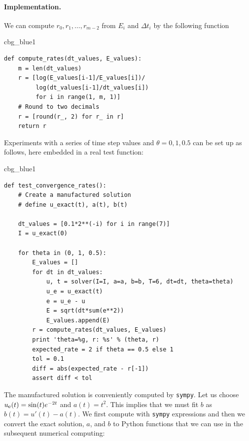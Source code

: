 \documentclass[%
oneside,                 %
final,                   %
10pt]{article}
\newenvironment{_cod_tight}[1]{
   \def\FrameCommand{\colorbox{#1}}
   \FrameRule0.6pt\MakeFramed {\FrameRestore}\vskip3mm}
   {\vskip0mm\endMakeFramed}
\newenvironment{cod}[1]{
\bgroup\rmfamily
\fboxsep=0mm\relax
\begin{_cod_tight}{#1}
\list{}{\parsep=-2mm\parskip=0mm\topsep=0pt\leftmargin=2mm
\rightmargin=2\leftmargin\leftmargin=4pt\relax}
\item\relax}
{\endlist\end{_cod_tight}\egroup}
\begin{document}
\paragraph{Implementation.}
We can compute $r_0, r_1, \ldots, r_{m-2}$ from $E_i$ and $\Delta t_i$
by the following function

\begin{cod}{cbg_blue1}\begin{Verbatim}[numbers=none,fontsize=\fontsize{9pt}{9pt},baselinestretch=0.95,xleftmargin=2mm]
def compute_rates(dt_values, E_values):
    m = len(dt_values)
    r = [log(E_values[i-1]/E_values[i])/
         log(dt_values[i-1]/dt_values[i])
         for i in range(1, m, 1)]
    # Round to two decimals
    r = [round(r_, 2) for r_ in r]
    return r
\end{Verbatim}
\end{cod}
\noindent

Experiments with a series of time step values and $\theta=0,1,0.5$
can be set up as follows, here embedded in a real test function:

\begin{cod}{cbg_blue1}\begin{Verbatim}[numbers=none,fontsize=\fontsize{9pt}{9pt},baselinestretch=0.95,xleftmargin=2mm]
def test_convergence_rates():
    # Create a manufactured solution
    # define u_exact(t), a(t), b(t)

    dt_values = [0.1*2**(-i) for i in range(7)]
    I = u_exact(0)

    for theta in (0, 1, 0.5):
        E_values = []
        for dt in dt_values:
            u, t = solver(I=I, a=a, b=b, T=6, dt=dt, theta=theta)
            u_e = u_exact(t)
            e = u_e - u
            E = sqrt(dt*sum(e**2))
            E_values.append(E)
        r = compute_rates(dt_values, E_values)
        print 'theta=%g, r: %s' % (theta, r)
        expected_rate = 2 if theta == 0.5 else 1
        tol = 0.1
        diff = abs(expected_rate - r[-1])
        assert diff < tol
\end{Verbatim}
\end{cod}
\noindent

The manufactured solution is conveniently computed by \texttt{sympy}.
Let us choose $\uex(t) = \sin(t)e^{-2t}$ and $a(t)=t^2$.
This implies that we must fit $b$ as $b(t)=u'(t)-a(t)$.
We first compute with \texttt{sympy} expressions and then we convert
the exact solution, $a$, and $b$ to Python functions that we
can use in the subsequent numerical computing:
\end{document}
